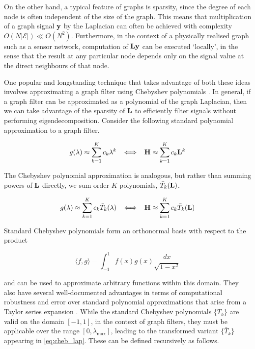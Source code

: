 On the other hand, a typical feature of graphs is sparsity, since the degree of each node is often independent of the size of the graph. This means that multiplication of a graph signal $\mathbf{y}$ by the Laplacian can often be achieved with complexity $O(N|\mathcal{E}|) \ll O(N^2)$. Furthermore, in the context of a physically realised graph such as a sensor network, computation of $\mathbf{L} \mathbf{y}$ can be executed `locally', in the sense that the result at any particular node depends only on the signal value at the direct neighbours of that node. 

One popular and longstanding technique that takes advantage of both these ideas involves approximating a graph filter using Chebyshev polynomials \citep{Shuman2018}. In general, if a graph filter can be approximated as a polynomial of the graph Laplacian, then we can take advantage of the sparsity of $\mathbf{L}$ to efficiently filter signals without performing eigendecomposition. Consider the following standard polynomial approximation to a graph filter. 

\begin{equation}
    \label{eq:poly_lap}
    g(\lambda) \approx \sum_{k=1}^K c_k \lambda^k \;\; \iff \;\; \mathbf{H} \approx \sum_{k=1}^K c_k \mathbf{L}^k
\end{equation}

The Chebyshev polynomial approximation is analogous, but rather than summing powers of $\mathbf{L}$ directly, we sum order-$K$ polynomials, $\bar{T}_k(\mathbf{L})$. 

\begin{equation}
    \label{eq:cheb_lap}
    g(\lambda) \approx \sum_{k=1}^K c_k \bar{T}_k(\lambda) \;\; \iff \;\; \mathbf{H} \approx \sum_{k=1}^K c_k \bar{T}_k(\mathbf{L})
\end{equation}

Standard Chebyshev polynomials form an orthonormal basis with respect to the product

\begin{equation}
    \langle f, g \rangle = \int_{-1}^1 f(x) g(x) \frac{dx}{\sqrt{1 - x^2}}
\end{equation}

and can be used to approximate arbitrary functions within this domain. They also have several well-documented advantages in terms of computational robustness and error over standard polynomial approximations that arise from a Taylor series expansion \citep{Rivlin2020}. While the standard Chebyshev polynomials $\{T_k\}$ are valid on the domain $[-1, 1]$, in the context of graph filters, they must be applicable over the range $[0, \lambda_{\text{max}}]$, leading to the transformed variant $\{\bar{T}_k\}$ appearing in \cref{eq:cheb_lap}. These can be defined recursively as follows. 

